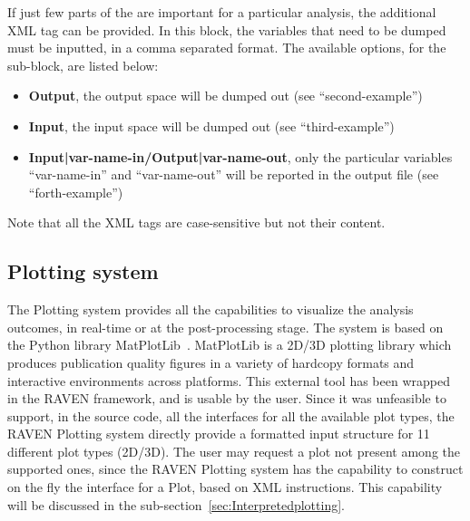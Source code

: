 If just few parts of the  are important for a particular analysis, the
additional XML tag  can be provided.
%
In this block, the variables that need to be dumped must be inputted, in a comma
separated format.
%
The available options, for the  sub-block, are listed below:
\vspace{-5mm}
\begin{itemize}
  \itemsep0em
  \item \textbf{Output}, the output space will be dumped out (see
  ``second-example'')
  \item \textbf{Input}, the input space will be dumped out (see
  ``third-example'')
  \item \textbf{Input|var-name-in/Output|var-name-out}, only the particular
  variables ``var-name-in'' and ``var-name-out'' will be reported in the output
  file (see ``forth-example'')
\end{itemize}
\vspace{-5mm}
Note that all the XML tags are case-sensitive but not their content.
%
%
\subsection{Plotting system \label{sec:plotting}}
The Plotting system provides all the capabilities to visualize the analysis
outcomes, in real-time or at the post-processing stage.
%
The system is based on the Python library MatPlotLib~\cite{MatPlotLib}.
%
MatPlotLib is a 2D/3D plotting library which produces publication quality
figures in a variety of hardcopy formats and interactive environments across
platforms.
%
This external tool has been wrapped in the RAVEN framework, and is usable by the
user.
%
Since it was unfeasible to support, in the source code, all the interfaces for
all the available plot types, the RAVEN Plotting system directly provide a
formatted input structure for 11 different plot types (2D/3D).
%
The user may request a plot not present among the supported ones, since the
RAVEN Plotting system has the capability to construct on the fly the interface
for a Plot, based on XML instructions.
%
This capability will be discussed in the
sub-section~\ref{sec:Interpretedplotting}.
%
